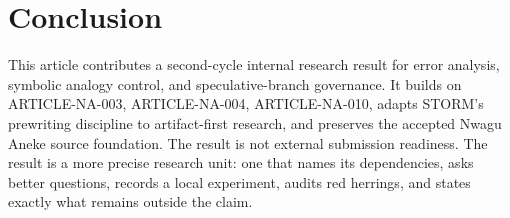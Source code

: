 \documentclass[sigconf,nonacm]{acmart}
\begin{document}
\section{Conclusion}
This article contributes a second-cycle internal research result for error analysis, symbolic analogy control, and speculative-branch governance. It
builds on ARTICLE-NA-003, ARTICLE-NA-004, ARTICLE-NA-010, adapts STORM's prewriting discipline to artifact-first
research, and preserves the accepted Nwagu Aneke source foundation. The result
is not external submission readiness. The result is a more precise research unit:
one that names its dependencies, asks better questions, records a local
experiment, audits red herrings, and states exactly what remains outside the
claim.



\end{document}

